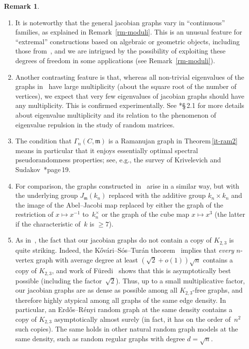 \documentclass[12pt]{amsart}
\renewcommand{\geq}{\geqslant}
\numberwithin{equation}{section}
\newcommand{\mfm}{\mathfrak{m}}
\theoremstyle{plain}
\theoremstyle{remark}
\theoremstyle{definition}
\newtheorem{remark}[theorem]{Remark}
\renewcommand{\geq}{\geqslant}
\begin{document}
\begin{remark}
\begin{enumerate}
  \item It is noteworthy that the general jacobian graphs vary in
    ``continuous'' families, as explained in
    Remark~\ref{rm-moduli}. This is an unusual feature for ``extremal''
    constructions based on algebraic or geometric objects, including
    those from~\cite{short}, and we are intrigued by the possibility of
    exploiting these degrees of freedom in some applications (see
    Remark~\ref{rm-moduli}).

\item Another contrasting feature is that, whereas all non-trivial
    eigenvalues of the graphs in~\cite{short} have large multiplicity
    (about the square root of the number of vertices), we expect that very
    few eigenvalues of jacobian graphs should have any
    multiplicity. This is confirmed experimentally. See \cite{short}*{\S\,2.1} for more details about eigenvalue multiplicity and its relation to the phenomenon of eigenvalue repulsion in the study of random matrices.

  \item The condition that $\Gamma_n(C,\mfm)$ is a Ramanujan graph in
    Theorem\,\ref{it-ram2} means in particular that it enjoys
    essentially optimal spectral pseudorandomness properties; see, e.g.,
    the survey of Krivelevich and Sudakov~\cite{ks}*{page\,19}.

  \item For comparison, the graphs constructed in~\cite{short} arise in
    a similar way, but with the underlying group $J_{\mfm}(k_n)$
    replaced with the additive group $k_n\times k_n$ and the image of
    the Abel--Jacobi map replaced by either the graph of the restriction
    of $x\mapsto x^{-1}$ to~$k_n^{\times}$ or the graph of the cube map
    $x\mapsto x^3$ (the latter if the characteristic of~$k$ is
    $\geq 7$).

  \item As in~\cite{short}, the fact that our jacobian graphs do not
    contain a copy of $K_{2,3}$ is quite striking. Indeed, the
    Kővári--Sós--Turán theorem~\cite{kst} implies that \emph{every}
    $n$-vertex graph with average degree at least
    $(\sqrt 2+o(1))\sqrt n$ contains a copy of $K_{2,3}$, and work of
    Füredi~\cite{furedi} shows that this is asymptotically best possible
    (including the factor~$\sqrt{2}$). Thus, up to a small
    multiplicative factor, our jacobian graphs are as dense as possible
    among all $K_{2,3}$-free graphs, and therefore highly atypical among
    all graphs of the same edge density. In particular, an Erdős--Rényi random graph at the same density
    contains a copy of $K_{2,3}$ asymptotically almost surely (in fact,
    it has on the order of~$n^2$ such copies). The same holds in other
    natural random graph models at the same density, such as random
    regular graphs with degree $d = \sqrt n$.


\end{enumerate}
\end{remark}
\end{document}
